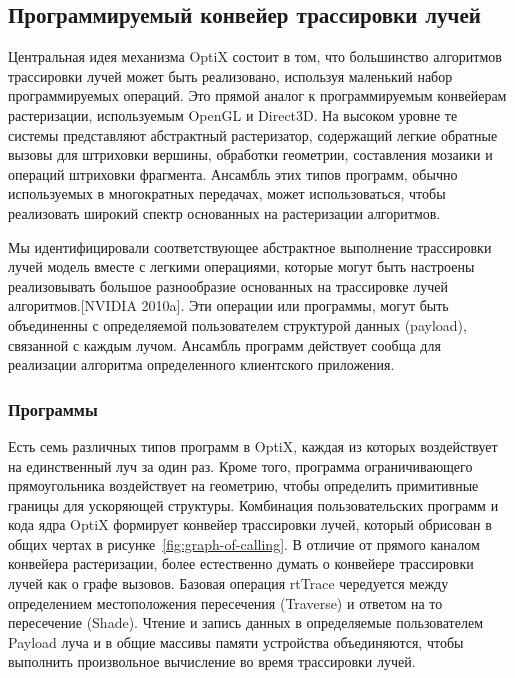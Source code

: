 \subsection{Программируемый конвейер трассировки лучей}
Центральная идея механизма OptiX состоит в том, что большинство алгоритмов трассировки лучей может быть реализовано, используя маленький набор программируемых операций. 
Это прямой аналог к программируемым конвейерам растеризации, используемым OpenGL и Direct3D. 
На высоком уровне те системы представляют абстрактный растеризатор, содержащий легкие обратные вызовы для штриховки вершины, обработки геометрии, составления мозаики и операций штриховки фрагмента. 
Ансамбль этих типов программ, обычно используемых в многократных передачах, может использоваться, чтобы реализовать широкий спектр основанных на растеризации алгоритмов. 
 
Мы идентифицировали соответствующее абстрактное выполнение трассировки лучей модель вместе с легкими операциями, которые могут быть настроены реализовывать большое разнообразие основанных на трассировке лучей алгоритмов.[NVIDIA 2010a]. 
Эти операции или программы, могут быть объединенны с определяемой пользователем структурой данных (payload), связанной с каждым лучом. 
Ансамбль программ действует сообща для реализации алгоритма определенного клиентского приложения.

\subsubsection{Программы}
Есть семь различных типов программ в OptiX, каждая из которых воздействует на единственный луч за один раз. 
Кроме того, программа ограничивающего прямоугольника воздействует на геометрию, чтобы определить примитивные границы для ускоряющей структуры. 
Комбинация пользовательских программ и кода ядра OptiX формирует конвейер трассировки лучей, который обрисован в общих чертах в рисунке~\ref{fig:graph-of-calling}. 
В отличие от прямого каналом конвейера растеризации, более естественно думать о конвейере трассировки лучей как о графе вызовов. 
Базовая операция rtTrace чередуется между определением местоположения пересечения (Traverse) и ответом на то пересечение (Shade). 
Чтение и запись данных в определяемые пользователем Payload луча и в общие массивы памяти устройства объединяются, чтобы выполнить произвольное вычисление во время трассировки лучей. 

